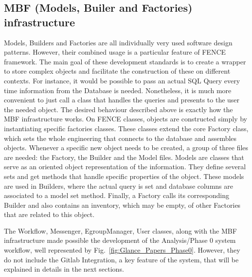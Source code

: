 \subsection{MBF (Models, Builer and Factories) infrastructure}
\label{sec:MBF_Models_Builder_and_Factories_infrastructure}
Models, Builders and Factories are all individually very used software design patterns. However, their combined usage is a particular feature of FENCE framework. The main goal of these development standards is to create a wrapper to store complex objects and facilitate the construction of these on different contexts. For instance, it would be possible to pass an actual SQL Query every time information from the Database is needed. Nonetheless, it is much more convenient to just call a class that handles the queries and presents to the user the needed object.
The desired behaviour described above is exactly how the MBF infrastructure works. On FENCE classes, objects are constructed simply by instantiating specific factories classes. These classes extend the core Factory class, which sets the whole engineering that connects to the database and assembles objects. Whenever a specific new object needs to be created, a group of three files are needed: the Factory, the Builder and the Model files. 
Models are classes that serve as an oriented object representation of the information. They define several sets and get methods that handle specific properties of the object. These models are used in Builders, where the actual query is set and database columns are associated to a model set method. Finally, a Factory calls its corresponding Builder and also contains an inventory, which may be empty, of other Factories that are related to this object.

The Workflow, Messenger, EgroupManager, User classes, along with the MBF infrastructure made possible the development of the Analysis/Phase 0 system workflow, well represented by Fig.~\ref{fig:Glance_Papers_Phase0}. However, they do not include the Gitlab Integration, a key feature of the system, that will be explained in details in the next sections.

